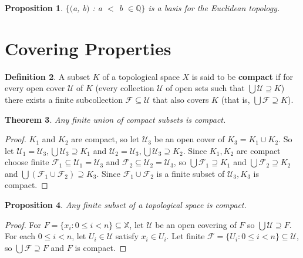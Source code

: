 \documentclass{amsart}
\theoremstyle{plain}
\newtheorem{theorem}{Theorem}
\newtheorem{proposition}[theorem]{Proposition}
\theoremstyle{definition}
\newtheorem{definition}[theorem]{Definition}
\theoremstyle{remark}
\begin{document}
	\begin{proposition}
	$\lbrace($a, b$)$ : a $<$ b $\in \mathbb{Q}\rbrace$ is a basis for the Euclidean topology.
	\end{proposition}

\section{Covering Properties}

	\begin{definition}
	  A subset \(K\) of a topological space \(X\) is said to be \textbf{compact} if for every
	  open cover \(\mathcal U\) of \(K\) (every collection \(\mathcal U\) of open sets
	  such that \(\bigcup \mathcal U\supseteq K\)) there exists a finite subcollection
	  \(\mathcal F\subseteq \mathcal U\) that also covers \(K\) (that is,
	  \(\bigcup\mathcal F\supseteq K\)).
	\end{definition}

	\begin{theorem}
	  Any finite union of compact subsets is compact.
	\end{theorem}

	\begin{proof}
	$K_1$ and $K_2$ are compact, so let $\mathcal{U}_3$ be an open cover of $K_3 = K_1 \cup K_2$. So let $\mathcal{U}_1 = \mathcal{U}_3, \bigcup \mathcal{U}_3 \supseteq K_1$ and $\mathcal{U}_2 = \mathcal{U}_3, \bigcup \mathcal{U}_3 \supseteq K_2$. Since $K_1, K_2$ are compact choose finite $\mathcal{F}_1 \subseteq \mathcal{U}_1 = \mathcal{U}_3$ and $\mathcal{F}_2 \subseteq \mathcal{U}_2 = \mathcal{U}_3$, so $\bigcup \mathcal{F}_1 \supseteq K_1$ and $\bigcup \mathcal{F}_2 \supseteq K_2$ and $\bigcup (\mathcal{F}_1 \cup \mathcal{F}_2) \supseteq K_3$. Since $\mathcal{F}_1 \cup \mathcal{F}_2$ is a finite subset of $\mathcal{U}_3, K_3$ is compact.
	\end{proof}

	\begin{proposition}
	  Any finite subset of a topological space is compact.
	\end{proposition}

	\begin{proof}
	For $F = \lbrace x_i : 0 \leq i < n \rbrace \subseteq \mathbb{X}$, let $\mathcal{U}$ be an open covering of $F$ so $\bigcup \mathcal{U} \supseteq F$. For each $0 \leq i < n$, let $U_i \in \mathcal{U}$ satisfy $x_i \in U_i$. Let finite $\mathcal{F} = \lbrace U_i : 0 \leq i < n \rbrace \subseteq \mathcal{U}$, so $\bigcup \mathcal{F} \supseteq F$ and $F$ is compact.
	\end{proof}
\end{document}
